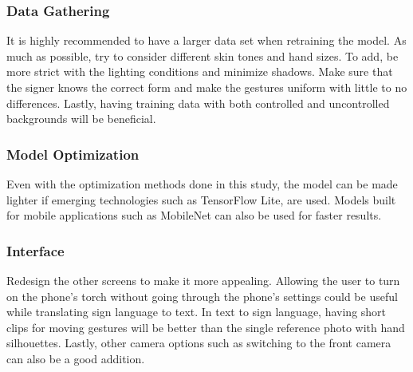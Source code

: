 \documentclass[journal]{./IEEE/IEEEtran}
\begin{document}
\subsubsection{Data Gathering}
It is highly recommended to have a larger data set when retraining the model. As much as possible, try to consider different skin tones and hand sizes. To add, be more strict with the lighting conditions and minimize shadows. Make sure that the signer knows the correct form and make the gestures uniform with little to no differences. Lastly, having training data with both controlled and uncontrolled backgrounds will be beneficial.
\newline
\subsubsection{Model Optimization}
Even with the optimization methods done in this study, the model can be made lighter if emerging technologies such as TensorFlow Lite, are used. Models built for mobile applications such as MobileNet can also be used for faster results.
\newline
\subsubsection{Interface}
Redesign the other screens to make it more appealing. Allowing the user to turn on the phone's torch without going through the phone's settings could be useful while translating sign language to text. In text to sign language, having short clips for moving gestures will be better than the single reference photo with hand silhouettes. Lastly, other camera options such as switching to the front camera can also be a good addition.



\end{document}
